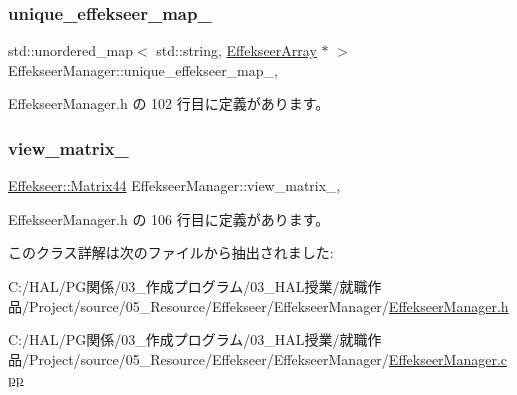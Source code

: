 \subsubsection{\texorpdfstring{unique\+\_\+effekseer\+\_\+map\+\_\+}{unique\_effekseer\_map\_}}
{\footnotesize\ttfamily std\+::unordered\+\_\+map$<$ std\+::string, \mbox{\hyperlink{class_effekseer_array}{Effekseer\+Array}} $\ast$ $>$ Effekseer\+Manager\+::unique\+\_\+effekseer\+\_\+map\+\_\+\hspace{0.3cm}{\ttfamily [static]}, {\ttfamily [private]}}



 Effekseer\+Manager.\+h の 102 行目に定義があります。

\mbox{\label{class_effekseer_manager_a0ea3c32637818a3fab28fb7d17a03970}} 
\subsubsection{\texorpdfstring{view\+\_\+matrix\+\_\+}{view\_matrix\_}}
{\footnotesize\ttfamily \mbox{\hyperlink{struct_effekseer_1_1_matrix44}{Effekseer\+::\+Matrix44}} Effekseer\+Manager\+::view\+\_\+matrix\+\_\+\hspace{0.3cm}{\ttfamily [static]}, {\ttfamily [private]}}



 Effekseer\+Manager.\+h の 106 行目に定義があります。



このクラス詳解は次のファイルから抽出されました\+:\begin{DoxyCompactItemize}
\item 
C\+:/\+H\+A\+L/\+P\+G関係/03\+\_\+作成プログラム/03\+\_\+\+H\+A\+L授業/就職作品/\+Project/source/05\+\_\+\+Resource/\+Effekseer/\+Effekseer\+Manager/\mbox{\hyperlink{_effekseer_manager_8h}{Effekseer\+Manager.\+h}}\item 
C\+:/\+H\+A\+L/\+P\+G関係/03\+\_\+作成プログラム/03\+\_\+\+H\+A\+L授業/就職作品/\+Project/source/05\+\_\+\+Resource/\+Effekseer/\+Effekseer\+Manager/\mbox{\hyperlink{_effekseer_manager_8cpp}{Effekseer\+Manager.\+cpp}}\end{DoxyCompactItemize}
